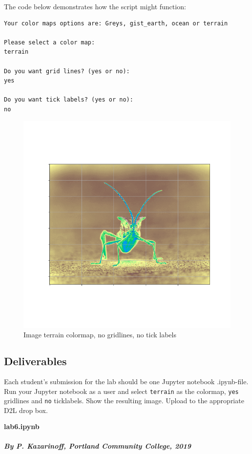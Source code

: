 \documentclass[11pt]{article}
\begin{document}
\newpage

The code below demonstrates how the script might function:

\begin{verbatim}
Your color maps options are: Greys, gist_earth, ocean or terrain

Please select a color map:
terrain

Do you want grid lines? (yes or no):
yes

Do you want tick labels? (yes or no):
no
\end{verbatim}

\begin{figure}[!h]
\centering
\includegraphics[scale=0.4]{images/image1.png}
\caption{Image terrain colormap, no gridlines, no tick labels}
\end{figure}

\hypertarget{deliverables}{%
\subsection{Deliverables}\label{deliverables}}

Each student's submission for the lab should be one Jupyter notebook
.ipynb-file. Run your Jupyter notebook as a user and select
\texttt{terrain} as the colormap, \texttt{yes} gridlines and \texttt{no}
ticklabels. Show the resulting image. Upload to the appropriate D2L drop
box.

\textbf{lab6.ipynb}

\hypertarget{by-p.-kazarinoff-portland-community-college-2019}{%
\paragraph{\texorpdfstring{\emph{By P. Kazarinoff, Portland Community
College,
2019}}{By P. Kazarinoff, Portland Community College, 2019}}\label{by-p.-kazarinoff-portland-community-college-2019}}
\end{document}
